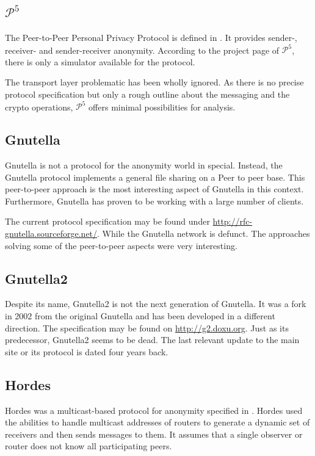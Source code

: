 \subsection{\texorpdfstring{$\mathcal{P}^5$}{P5}}
The Peer-to-Peer Personal Privacy Protocol is defined in \cite{sherwood-protocol}. It provides sender-, receiver- and sender-receiver anonymity. According to the project page of $\mathcal{P}^5$, there is only a simulator available for the protocol.

The transport layer problematic has been wholly ignored. As there is no precise protocol specification but only a rough outline about the messaging and the crypto operations, $\mathcal{P}^5$ offers minimal possibilities for analysis.

\subsection{Gnutella}
Gnutella is not a protocol for the anonymity world in special. Instead, the Gnutella protocol implements a general file sharing on a Peer to peer base. This peer-to-peer approach is the most interesting aspect of Gnutella in this context. Furthermore, Gnutella has proven to be working with a large number of clients.

The current protocol specification may be found under \href{http://rfc-gnutella.sourceforge.net/developer/stable/index.html}{http://rfc-gnutella.sourceforge.net/}. While the Gnutella network is defunct. The approaches solving some of the peer-to-peer aspects were very interesting.

\subsection{Gnutella2}
Despite its name, Gnutella2 is not the next generation of Gnutella. It was a fork in 2002 from the original Gnutella and has been developed in a different direction. The specification may be found on \url{http://g2.doxu.org}. Just as its predecessor, Gnutella2 seems to be dead. The last relevant update to the main site or its protocol is dated four years back.

\subsection{Hordes}
Hordes was a multicast-based protocol for anonymity specified in \cite{Levine:2002}. Hordes used the abilities to handle multicast addresses of routers to generate a dynamic set of receivers and then sends messages to them. It assumes that a single observer or router does not know all participating peers. 

